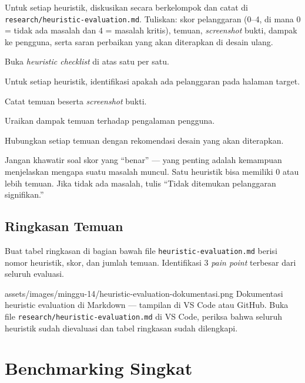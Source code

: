 Untuk setiap heuristik, diskusikan secara berkelompok dan catat di \texttt{research/heuristic-evaluation.md}. Tuliskan: skor pelanggaran (0--4, di mana 0 = tidak ada masalah dan 4 = masalah kritis), temuan, \emph{screenshot} bukti, dampak ke pengguna, serta saran perbaikan yang akan diterapkan di desain ulang.

\begin{langkah}
  \item Buka \emph{heuristic checklist} di atas satu per satu.
  \item Untuk setiap heuristik, identifikasi apakah ada pelanggaran pada halaman target.
  \item Catat temuan beserta \emph{screenshot} bukti.
  \item Uraikan dampak temuan terhadap pengalaman pengguna.
  \item Hubungkan setiap temuan dengan rekomendasi desain yang akan diterapkan.
\end{langkah}

\begin{tip}
Jangan khawatir soal skor yang ``benar'' --- yang penting adalah kemampuan menjelaskan mengapa suatu masalah muncul. Satu heuristik bisa memiliki 0 atau lebih temuan. Jika tidak ada masalah, tulis ``Tidak ditemukan pelanggaran signifikan.''
\end{tip}

\subsection{Ringkasan Temuan}
\label{subsec:ringkasan-temuan}

Buat tabel ringkasan di bagian bawah file \texttt{heuristic-evaluation.md} berisi nomor heuristik, skor, dan jumlah temuan. Identifikasi 3 \emph{pain point} terbesar dari seluruh evaluasi.

\begin{tangkapanlayar}
  {assets/images/minggu-14/heuristic-evaluation-dokumentasi.png}
  {Dokumentasi heuristic evaluation di Markdown --- tampilan di VS Code atau GitHub.}
  {Buka file \texttt{research/heuristic-evaluation.md} di VS Code, periksa bahwa seluruh heuristik sudah dievaluasi dan tabel ringkasan sudah dilengkapi.}
\end{tangkapanlayar}

\section{Benchmarking Singkat}
\label{sec:benchmarking}

